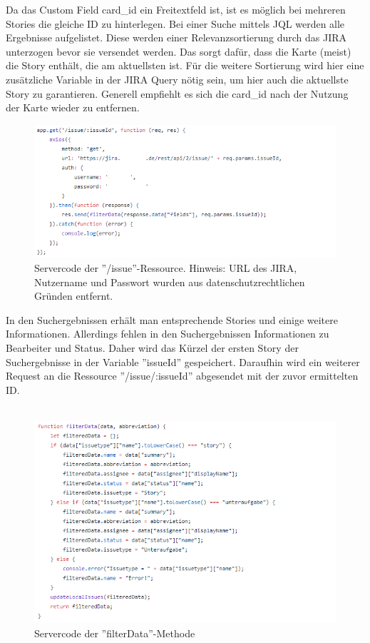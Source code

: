 \documentclass[12pt,titlepage]{scrartcl}
\begin{document}
			\noindent Da das Custom Field card\_id ein Freitextfeld ist, ist es möglich bei mehreren Stories die gleiche ID zu hinterlegen. Bei einer Suche mittels JQL werden alle Ergebnisse aufgelistet. Diese werden einer Relevanzsortierung durch das JIRA unterzogen bevor sie versendet werden. Das sorgt dafür, dass die Karte (meist) die Story enthält, die am aktuellsten ist. Für die weitere Sortierung wird hier eine zusätzliche Variable in der JIRA Query nötig sein, um hier auch die aktuellste Story zu garantieren. Generell empfiehlt es sich die card\_id nach der Nutzung der Karte wieder zu entfernen.
			\begin{figure}[H] 
  				\centering
    			\includegraphics[height=0.3\textheight]{serverIssue}
  				\caption{Servercode der ''/issue''-Ressource. Hinweis: URL des JIRA, Nutzername und Passwort wurden aus datenschutzrechtlichen Gründen entfernt.}
  				\label{fig:serverIssue}
			\end{figure}
			\noindent In den Suchergebnissen erhält man entsprechende Stories und einige weitere Informationen. Allerdings fehlen in den Suchergebnissen Informationen zu Bearbeiter und Status. Daher wird das Kürzel der ersten Story der Suchergebnisse in der Variable ''issueId'' gespeichert. Daraufhin wird ein weiterer Request an die Ressource ''/issue/:issueId'' abgesendet mit der zuvor ermittelten ID. \\ \\
			\begin{figure}[H] 
  				\centering
    			\includegraphics[height=0.5\textheight]{serverFilterData}
  				\caption{Servercode der ''filterData''-Methode}
  				\label{fig:serverFilterData}
			\end{figure}
\end{document}
